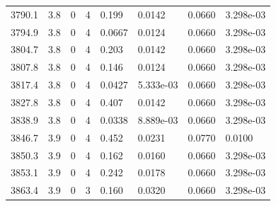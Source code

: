 \documentclass[preview]{standalone}
\begin{document}
{{{{{{{{{{{{{{{{\begin{tabular}{L{1.2cm}C{1.2cm} C{0.3cm}C{0.5cm} C{1.4cm}C{1.4cm} C{1.4cm}C{1.4cm}}
  3790.1  &   3.8  & 0     &  4 &  0.199  & 0.0142  & 0.0660 &  3.298e-03   \\ 
  3794.9  &   3.8  & 0     &  4 &  0.0667  & 0.0124  & 0.0660 &  3.298e-03   \\ 
  3804.7  &   3.8  & 0     &  4 &  0.203  & 0.0142  & 0.0660 &  3.298e-03   \\ 
  3807.8  &   3.8  & 0     &  4 &  0.146  & 0.0124  & 0.0660 &  3.298e-03   \\ 
  3817.4  &   3.8  & 0     &  4 &  0.0427  & 5.333e-03  & 0.0660 &  3.298e-03   \\ 
  3827.8  &   3.8  & 0     &  4 &  0.407  & 0.0142  & 0.0660 &  3.298e-03   \\ 
  3838.9  &   3.8  & 0     &  4 &  0.0338  & 8.889e-03  & 0.0660 &  3.298e-03   \\ 
  3846.7  &   3.9  & 0     &  4 &  0.452  & 0.0231  & 0.0770 &  0.0100   \\ 
  3850.3  &   3.9  & 0     &  4 &  0.162  & 0.0160  & 0.0660 &  3.298e-03   \\ 
  3853.1  &   3.9  & 0     &  4 &  0.242  & 0.0178  & 0.0660 &  3.298e-03   \\ 
  3863.4  &   3.9  & 0     &  3 &  0.160  & 0.0320  & 0.0660 &  3.298e-03   \\ 
\hline 
\end{tabular} 

}}}}}}}}}}}}}}}}
\end{document}
